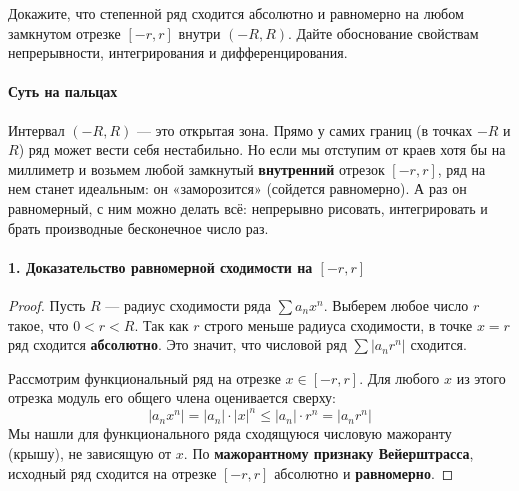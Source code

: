 {Докажите, что степенной ряд сходится абсолютно и равномерно на любом замкнутом отрезке $[-r, r]$ внутри $(-R, R)$. Дайте обоснование свойствам непрерывности, интегрирования и дифференцирования.}

\paragraph{Суть на пальцах}
Интервал $(-R, R)$ — это открытая зона. Прямо у самих границ (в точках $-R$ и $R$) ряд может вести себя нестабильно. Но если мы отступим от краев хотя бы на миллиметр и возьмем любой замкнутый \textbf{внутренний} отрезок $[-r, r]$, ряд на нем станет идеальным: он «заморозится» (сойдется равномерно). А раз он равномерный, с ним можно делать всё: непрерывно рисовать, интегрировать и брать производные бесконечное число раз.

\paragraph{1. Доказательство равномерной сходимости на $[-r, r]$}
\begin{proof}
Пусть $R$ — радиус сходимости ряда $\sum a_n x^n$. Выберем любое число $r$ такое, что $0 < r < R$. 
Так как $r$ строго меньше радиуса сходимости, в точке $x = r$ ряд сходится \textbf{абсолютно}. Это значит, что числовой ряд $\sum |a_n r^n|$ сходится.

Рассмотрим функциональный ряд на отрезке $x \in [-r, r]$. Для любого $x$ из этого отрезка модуль его общего члена оценивается сверху:
$$ |a_n x^n| = |a_n| \cdot |x|^n \le |a_n| \cdot r^n = |a_n r^n| $$
Мы нашли для функционального ряда сходящуюся числовую мажоранту (крышу), не зависящую от $x$. По \textbf{мажорантному признаку Вейерштрасса}, исходный ряд сходится на отрезке $[-r, r]$ абсолютно и \textbf{равномерно}.
\end{proof}

